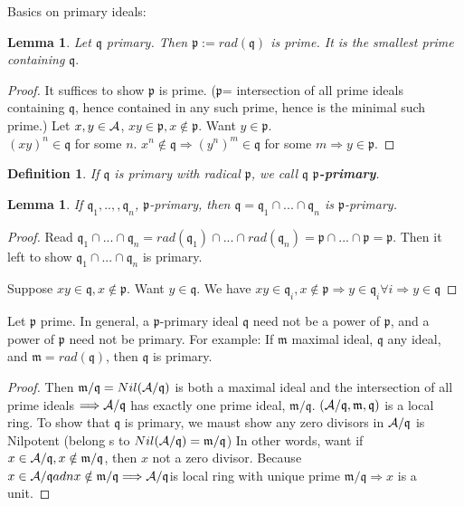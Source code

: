 \documentclass[11pt]{article}
\newtheorem{lemma}[thm]{Lemma}
\newtheorem{dfn}[thm]{Definition}
\newcommand{\scm}{{\mathfrak m}}
\newcommand{\scp}{{\mathfrak p}}
\newcommand{\scq}{\mathfrak q}
\newcommand{\cala}{{\cal A}}
\newcommand{\Lrta}{\Longrightarrow}
\begin{document}
Basics on primary ideals:\\
\begin{lemma}
Let $\scq$ primary. Then $\scp:=rad(\scq)$ is prime. It is the smallest prime containing $\scq.$
\end{lemma}
\begin{proof}
It suffices to show $\scp$ is prime. ($\scp$= intersection of all prime ideals containing $\scq$, hence contained in any such prime, hence is the minimal such prime.) Let $x,y\in\cala$, $xy\in\scp,x\notin \scp$. Want $y\in\scp$.\\
 $(xy)^n\in\scq$ for some $n$. $x^n\notin\scq\Lrta (y^n)^m\in\scq $ for some $m$$\Lrta  y\in\scp$.
\end{proof}
\begin{dfn}
If $\scq$ is primary with radical $\scp$, we call $\scq$ \textbf{$\scp$-primary}.
\end{dfn}
\begin{lemma}
If $\scq_1,..,,\scq_n$, $\scp$-primary, then $\scq=\scq_1\cap...\cap \scq_n$ is $\scp$-primary.
\end{lemma}
\begin{proof}
Read $\scq_1\cap...\cap\scq_n=rad(\scq_1)\cap...\cap rad(\scq_n)=\scp\cap...\cap \scp=\scp$. Then it left to show $\scq_1\cap...\cap\scq_n$ is primary. 

Suppose $xy\in\scq, x\notin \scp$. Want $y\in \scq$. We have $xy\in \scq_i,x\notin\scp\Lrta y\in \scq_i\forall i\Lrta y\in\scq$
\end{proof}

Let $\scp$ prime. In general, a $\scp$-primary ideal $\scq$ need not be a power of $\scp$, and a power of $\scp$ need not be primary. For example:
If $\scm$ maximal ideal, $\scq$ any ideal, and $\scm=rad(\scq)$, then $\scq$ is primary.
\begin{proof}
Then $\scm/\scq=Nil(\cala/\scq)$ is both a maximal ideal and the intersection of all prime ideals $\Lrta\cala/\scq$ has exactly one prime ideal, $\scm/\scq$. $(\cala/\scq,\scm,\scq)$ is a local ring. To show that $\scq$ is primary, we maust show any zero divisors in $\cala/\scq$ is Nilpotent (belong s to $Nil(\cala/\scq)=\scm/\scq$) In other words, want if $x\in\cala/\scq,x\notin\scm/\scq$, then $x$ not a zero divisor. Because $x\in\cala/\scq adn x\notin \scm/\scq\Lrta \cala/\scq $is local ring with unique prime $\scm/\scq\Lrta x$ is a unit.
\end{proof}
\end{document}
